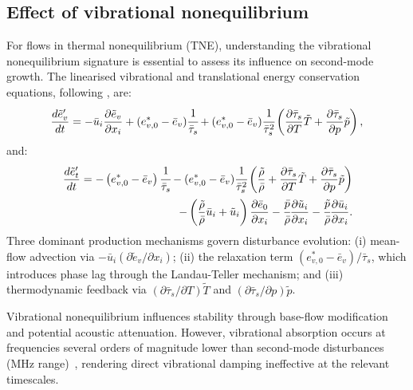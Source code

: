 \subsection{Effect of vibrational nonequilibrium}
For flows in thermal nonequilibrium (\gls{TNE}), understanding the vibrational nonequilibrium signature is essential to assess its influence on second-mode growth. The linearised vibrational and translational energy conservation equations, following \citet{WagnildEtAl2012}, are:
\begin{equation}\label{equation:vibrational_disturbance}
\frac{d\tilde{e}_v'}{dt} = -\bar{u}_i \frac{\partial \tilde{e}_{v}}{\partial x_i} + (e_{v,0}^* - \bar{e}_v) \cfrac{1}{\bar{\tau}_{s}} + (e_{v,0}^* - \bar{e}_v) \cfrac{1}{\bar{\tau}_{s}^2} \left( \frac{\partial \bar{\tau}_s}{\partial T} \tilde{T} + \frac{\partial \bar{\tau}_s}{\partial p} \tilde{p} \right),
\end{equation}
and:
\begin{equation}\label{equation:translational_disturbance}
\begin{split}
\frac{d\tilde{e}_t'}{dt} = -\left(e_{v,0}^* - \bar{e}_v\right) \cfrac{1}{\bar{\tau}_{s}} - (e_{v,0}^* - \bar{e}_v) \cfrac{1}{\bar{\tau}_{s}^2} \left( \frac{\tilde{\rho}}{\bar{\rho}} + \frac{\partial \bar{\tau}_s}{\partial T} \tilde{T} + \frac{\partial \bar{\tau}_s}{\partial p} \tilde{p} \right) \\
- \left( \frac{\tilde{\rho}}{\bar{\rho}} \bar{u}_{i} + \tilde{u}_i \right) \frac{\partial \bar{e}_0}{\partial x_i} - \cfrac{\bar{p}}{\bar{\rho}} \frac{\partial \tilde{u}_i}{\partial x_i} - \cfrac{\tilde{p}}{\bar{\rho}} \frac{\partial \bar{u}_{i}}{\partial x_i}.
\end{split}
\end{equation}
Three dominant production mechanisms govern disturbance evolution: (i) mean-flow advection via $-\bar{u}_i (\partial \tilde{e}_{v}/\partial x_i)$; (ii) the relaxation term $(e_{v,0}^* - \bar{e}_v)/\bar{\tau}_s$, which introduces phase lag through the Landau-Teller mechanism; and (iii) thermodynamic feedback via $(\partial \bar{\tau}_s/\partial T) \tilde{T}$ and $(\partial \bar{\tau}_s/\partial p) \tilde{p}$.

Vibrational nonequilibrium influences stability through base-flow modification and potential acoustic attenuation. However, vibrational absorption occurs at frequencies several orders of magnitude lower than second-mode disturbances (MHz range)~\citep{BitterShepherd2015}, rendering direct vibrational damping ineffective at the relevant timescales.

